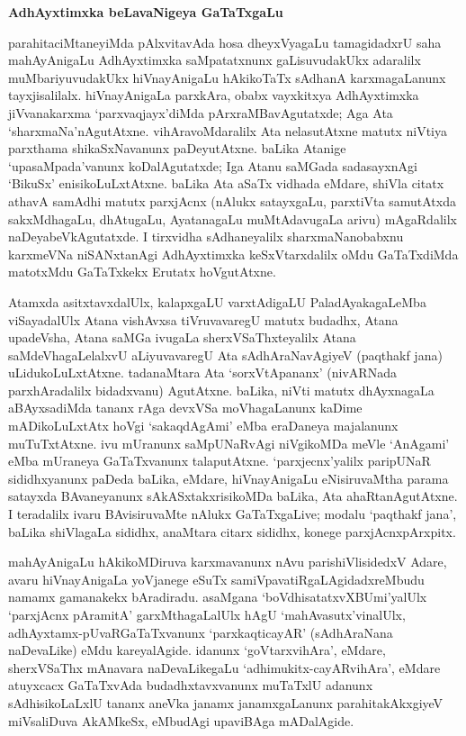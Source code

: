 \begin{center}
{\textbf{\Large AdhAyxtimxka beLavaNigeya GaTaTxgaLu}}
\end{center}

parahitaciMtaneyiMda pAlxvitavAda hosa dheyxVyagaLu tamagidadxrU saha mahAyAnigaLu AdhAyxtimxka saMpatatxnunx gaLisuvudakUkx adaralilx muMbariyuvudakUkx hiVnayAnigaLu hAkikoTaTx sAdhanA karxmagaLanunx tayxjisalilalx. hiVnayAnigaLa parxkAra, obabx vayxkitxya AdhAyxtimxka jiVvanakarxma `parxvaqjayx'diMda pArxraMBavAgutatxde; Aga Ata `sharxmaNa'nAgutAtxne. vihAravoMdaralilx Ata nelasutAtxne matutx niVtiya parxthama shikaSxNavanunx paDeyutAtxne. baLika Atanige `upasaMpada'vanunx koDalAgutatxde; Iga Atanu saMGada sadasayxnAgi `BikuSx' enisikoLuLxtAtxne. baLika Ata aSaTx vidhada eMdare, shiVla citatx athavA samAdhi matutx parxjAcnx (nAlukx satayxgaLu, parxtiVta samutAtxda sakxMdhagaLu, dhAtugaLu, AyatanagaLu muMtAdavugaLa arivu) mAgaRdalilx naDeyabeVkAgutatxde. I tirxvidha sAdhaneyalilx sharxmaNanobabxnu karxmeVNa niSANxtanAgi AdhAyxtimxka keSxVtarxdalilx oMdu GaTaTxdiMda matotxMdu GaTaTxkekx Erutatx hoVgutAtxne.

Atamxda asitxtavxdalUlx, kalapxgaLU varxtAdigaLU PaladAyakagaLeMba viSayadalUlx Atana vishAvxsa tiVruvavaregU matutx budadhx, Atana upadeVsha, Atana saMGa ivugaLa sherxVSaThxteyalilx Atana saMdeVhagaLelalxvU aLiyuvavaregU Ata sAdhAraNavAgiyeV (paqthakf jana) uLidukoLuLxtAtxne. tadanaMtara Ata `sorxVtApananx' (nivARNada parxhAradalilx bidadxvanu) AgutAtxne. baLika, niVti matutx dhAyxnagaLa aBAyxsadiMda tananx rAga devxVSa moVhagaLanunx kaDime mADikoLuLxtAtx hoVgi `sakaqdAgAmi' eMba eraDaneya majalanunx muTuTxtAtxne. ivu mUranunx saMpUNaRvAgi niVgikoMDa meVle `AnAgami' eMba mUraneya GaTaTxvanunx talaputAtxne. `parxjecnx'yalilx paripUNaR sididhxyanunx paDeda baLika, eMdare, hiVnayAnigaLu eNisiruvaMtha parama satayxda BAvaneyanunx sAkASxtakxrisikoMDa baLika, Ata ahaRtanAgutAtxne. I teradalilx ivaru BAvisiruvaMte nAlukx GaTaTxgaLive; modalu `paqthakf jana', baLika shiVlagaLa sididhx, anaMtara citarx sididhx, konege parxjAcnxpArxpitx.

\newpage

mahAyAnigaLu hAkikoMDiruva karxmavanunx nAvu parishiVlisidedxV Adare, avaru hiVnayAnigaLa yoVjanege eSuTx samiVpavatiRgaLAgidadxreMbudu namamx gamanakekx bAradiradu. asaMgana `boVdhisatatxvXBUmi'yalUlx `parxjAcnx pAramitA' garxMthagaLalUlx hAgU `mahAvasutx'vinalUlx, adhAyxtamx-pUvaRGaTaTxvanunx `parxkaqticayAR' (sAdhAraNana naDevaLike) eMdu kareyalAgide. idanunx `goVtarxvihAra', eMdare, sherxVSaThx mAnavara naDevaLikegaLu `adhimukitx-cayARvihAra', eMdare atuyxcacx GaTaTxvAda budadhxtavxvanunx muTaTxlU adanunx sAdhisikoLaLxlU tananx aneVka janamx janamxgaLanunx parahitakAkxgiyeV miVsaliDuva AkAMkeSx, eMbudAgi upaviBAga mADalAgide.

